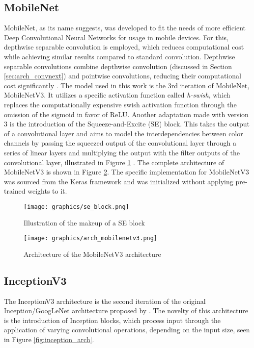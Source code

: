 \documentclass[draft,final]{vutinfth} %
\begin{document}
\subsection{MobileNet}
MobileNet, as its name suggests, was developed to fit the needs of more efficient Deep Convolutional Neural Networks for usage in mobile devices. For this, depthwise separable convolution is employed, which reduces computational cost while achieving similar results compared to standard convolution. Depthwise separable convolutions combine depthwise convolution (discussed in Section \ref{sec:arch_convnext}) and pointwise convolutions, reducing their computational cost significantly \cite{howard_mobilenets_2017}. The model used in this work is the 3rd iteration of MobileNet, MobileNetV3. It utilizes a specific activation function called \textit{h-swish}, which replaces the computationally expensive swish activation function through the omission of the sigmoid in favor of ReLU. Another adaptation made with version 3 is the introduction of the Squeeze-and-Excite (SE) block. This takes the output of a convolutional layer and aims to model the interdependencies between color channels by passing the squeezed output of the convolutional layer through a series of linear layers and multiplying the output with the filter outputs of the convolutional layer, illustrated in Figure \ref{fig:se_block} \cite{howard_searching_2019, erdogan_squeeze-and-excitation_2022}.
The complete architecture of MobileNetV3 is shown in Figure \ref{fig:arch_mobilenetv3}. The specific implementation for MobileNetV3 was sourced from the Keras framework \cite{chollet_keras_2015} and was initialized without applying pre-trained weights to it.

\begin{figure}
    \centering
    \texttt{[image: graphics/se\_block.png]}
    \caption{Illustration of the makeup of a SE block \cite{erdogan_squeeze-and-excitation_2022}}
    \label{fig:se_block}
\end{figure}

\begin{figure}
    \centering
    \texttt{[image: graphics/arch\_mobilenetv3.png]}
    \caption{Architecture of the MobileNetV3 architecture \cite{elsayed_abd_elaziz_evolution_2023}}
    \label{fig:arch_mobilenetv3}
\end{figure}

\subsection{InceptionV3} \label{sec:meth_disease_inception}
The InceptionV3 architecture is the second iteration of the original Inception/GoogLeNet architecture proposed by \citeauthor{szegedy_going_2014} \cite{szegedy_going_2014}. The novelty of this architecture is the introduction of Inception blocks, which process input through the application of varying convolutional operations, depending on the input size, seen in Figure \ref{fig:inception_arch}.
\end{document}
